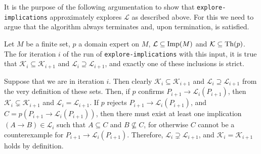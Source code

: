 It is the purpose of the following argumentation to show that
\lstinline{explore-implications} approximately explores $\mathcal{L}$ as described above.
For this we need to argue that the algorithm always terminates and, upon termination,
 is satisfied.

\begin{Proposition}
  \label{prop:technicalities-about-explore-implications}
  Let $M$ be a finite set, $p$ a domain expert on $M$, $\mathcal{L} \subseteq \operatorname{Imp}(M)$ and
  $\mathcal{K} \subseteq \operatorname{Th}(p)$.  The for iteration $i$ of the run of
  \lstinline{explore-implications} with this input, it is true that $\mathcal{K}_i
  \subseteq \mathcal{K}_{i+1}$ and $\mathcal{L}_i \supseteq \mathcal{L}_{i+1}$, and
  exactly one of these inclusions is strict.
\end{Proposition}
\begin{Proof}
  Suppose that we are in iteration $i$.  Then clearly $\mathcal{K}_i \subseteq
  \mathcal{K}_{i+1}$ and $\mathcal{L}_i \supseteq \mathcal{L}_{i+1}$ from the very
  definition of these sets.  Then, if $p$ confirms $P_{i+1} \to \mathcal{L}_i(P_{i+1})$,
  then $\mathcal{K}_i \subsetneq \mathcal{K}_{i+1}$ and $\mathcal{L}_i =
  \mathcal{L}_{i+1}$.  If $p$ rejects $P_{i+1} \to \mathcal{L}_i(P_{i+1})$, and $C =
  p(P_{i+1} \to \mathcal{L}_i(P_{i+1}))$, then there must exist at least one implication
  $(A \to B) \in \mathcal{L}_i$ such that $A \subseteq C$ and $B \not\subseteq C$, for
  otherwise $C$ cannot be a counterexample for $P_{i+1} \to \mathcal{L}_i(P_{i+1})$.
  Therefore, $\mathcal{L}_i \supsetneq \mathcal{L}_{i+1}$, and $\mathcal{K}_i =
  \mathcal{K}_{i+1}$ holds by definition.
\end{Proof}

